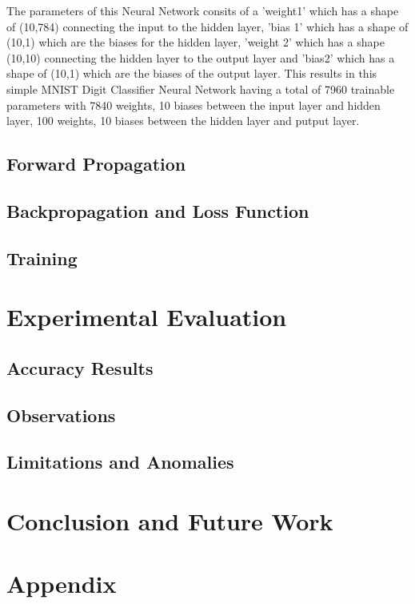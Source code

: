 \documentclass[11pt]{article}
\begin{document}
\vspace{1em}
The parameters of this Neural Network consits of a 'weight1' which has a shape of (10,784) connecting the input to the hidden layer, 'bias 1' which has a shape of (10,1) which are the biases for the hidden layer, 'weight 2' which has a shape (10,10) connecting the hidden layer to the output layer and 'bias2' which has a shape of (10,1) which are the biases of the output layer. This results in this simple MNIST Digit Classifier Neural Network having a total of 7960 trainable parameters with 7840 weights, 10 biases between the input layer and hidden layer, 100 weights, 10 biases between the hidden layer and putput layer.

\subsection{Forward Propagation}

\subsection{Backpropagation and Loss Function}

\subsection{Training}

\section{Experimental Evaluation}
\subsection{Accuracy Results}

\subsection{Observations}

\subsection{Limitations and Anomalies}

\section{Conclusion and Future Work}

\appendix
\section*{Appendix}

\begin{thebibliography}{9}
\end{thebibliography}
\end{document}
